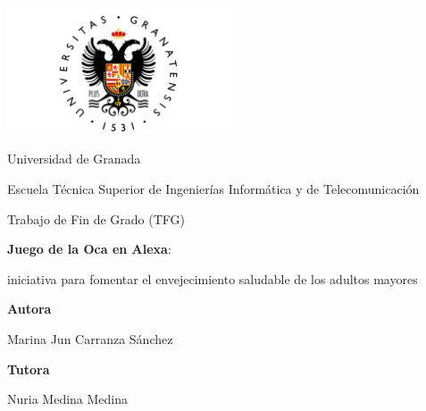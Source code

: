 \documentclass[12pt]{article}
\begin{document}
\begin{titlepage}
    \centering
    \begin{minipage}{1\textwidth}
        \raisebox{-0.7\height}
        {\includegraphics[width=0.5\textwidth]{UGR-Logo}}
    \end{minipage}
   
    \vspace{1.5cm}

    {\LARGE Universidad de Granada \par}
    \vspace{0.5cm}

    {\Large Escuela Técnica Superior de Ingenierías Informática y de Telecomunicación \par}

    \vspace{1cm}
    
    {\LARGE {Trabajo de Fin de Grado (TFG)} \par}
    \vspace{1.5cm}

    {\Huge \textbf{Juego de la Oca en Alexa}:
    	
	iniciativa para fomentar el envejecimiento saludable de los adultos mayores \par}
    
    \vspace{1.5cm}

    \vfill

    {\Large \textbf{Autora} \par}
    {\Large Marina Jun Carranza Sánchez \par}
    \vspace{0.5cm}

    {\Large \textbf{Tutora} \par}
    {\Large Nuria Medina Medina \par}
    
\end{titlepage}
\end{document}
